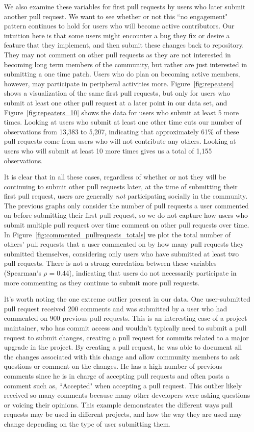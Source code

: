 \documentclass{sigchi}
\begin{document}
We also examine these variables for first pull requests by users who later
submit another pull request. We want to see whether or not this ``no engagement"
pattern continues to hold for users who will become active contributors. Our
intuition here is that some users might encounter a bug they fix or desire a
feature that they implement, and then submit these changes back to repository.
They may not comment on other pull requests as they are not interested in
becoming long term members of the community, but rather are just interested in
submitting a one time patch. Users who do plan on becoming active members,
however, may participate in peripheral activities more.
Figure~\ref{fig:repeaters} shows a visualization of the same first pull
requests, but only for users who submit at least one other pull request at a
later point in our data set, and Figure~\ref{fig:repeaters_10} shows the data
for users who submit at least 5 more times. Looking at users who submit at least
one other time cuts our number of observations from 13,383 to 5,207, indicating
that approximately 61\% of these pull requests come from users who will not
contribute any others. Looking at users who will submit at least 10 more times
gives us a total of 1,155 observations.

It is clear that in all these cases, regardless of whether or not they will be
continuing to submit other pull requests later, at the time of submitting their
first pull request, users are generally \textit{not} participating socially in
the community. The previous graphs only consider the number of pull requests a
user commented on before submitting their first pull request, so we do not
capture how users who submit multiple pull request over time comment on other
pull requests over time. In Figure~\ref{fig:commented_pullrequests_totals} we
plot the total number of others' pull requests that a user commented on by how
many pull requests they submitted themselves, considering only users who have
submitted at least two pull requests. There is not a strong correlation between
these variables (Spearman's $\rho$ = 0.44), indicating that users do not
necessarily participate in more commenting as they continue to submit more pull
requests.

It's worth noting the one extreme outlier present in our data. One
user-submitted pull request received 200 comments and was submitted by a user
who had commented on 900 previous pull requests. This is an interesting case of
a project maintainer, who has commit access and wouldn't typically need to
submit a pull request to submit changes, creating a pull request for commits
related to a major upgrade in the project. By creating a pull request, he was
able to document all the changes associated with this change and allow community
members to ask questions or comment on the changes. He has a high number of
previous comments since he is in charge of accepting pull requests and often
posts a comment such as, ``Accepted" when accepting a pull request. This outlier
likely received so many comments because many other developers were asking
questions or voicing their opinions. This example demonstrates the different
ways pull requests may be used in different projects, and how the way they are
used may change depending on the type of user submitting them.
\end{document}
